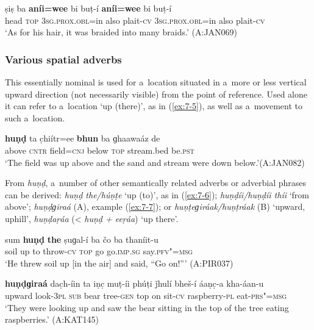 \begin{exe}
\ex
\label{ex:7-4}
\gll ṣiṣ ba \textbf{aníi=wee} bi buṭ-í \textbf{aníi=wee}  bi buṭ-í \\
head \textsc{top} \textsc{3sg.prox.obl=}in also plait-\textsc{cv} \textsc{3sg.prox.obl=}in also plait-\textsc{cv} \\
\glt `As for his hair, it was braided into many braids.' (A:JAN069)
\end{exe}

\subsubsection*{Various spatial adverbs}

 This essentially nominal  is used for a~location situated in a~more or less vertical upward direction (not necessarily visible) from the point of reference. Used alone it can refer to a~location `up (there)', as in (\ref{ex:7-5}), as well as a~movement to such a~location.

\begin{exe}
\ex
\label{ex:7-5}
\gll \textbf{huṇḍ} ta c̣hiítr=ee \textbf{bhun} ba ɡhaawaáz de  \\
above \textsc{cntr} field=\textsc{cnj} below \textsc{top} stream.bed be.\textsc{pst} \\
\glt `The field was up above and the sand and stream were down below.'\newline (A:JAN082)
\end{exe}
From \textit{huṇḍ}, a~number of other semantically related adverbs or adverbial phrases can be derived: \textit{huṇḍ the/húṇṭe} `up (to)', as in (\ref{ex:7-6}); \textit{huṇḍíi/huṇḍíi thíi} `from above'; \textit{huṇḍɡiraá} (A), example (\ref{ex:7-7}); or \textit{huṇṭeɡiráak/huṇṭráak} (B) `upward, uphill', \textit{huṇḍaṛáa} ({\textless} \textit{huṇḍ + eeṛáa}) `up there'.

\begin{exe}
\ex
\label{ex:7-6}
\gll sum \textbf{huṇḍ} \textbf{the} ṣuɡal-í ba čo ba  thaníit-u \\
soil up to throw-\textsc{cv} \textsc{top} go go.\textsc{imp.sg} say.\textsc{pfv"=msg} \\
\glt `He threw soil up [in the air] and said, ``Go on!''' (A:PIR037)

\ex
\label{ex:7-7}
\gll \textbf{huṇḍɡiraá} dac̣h-íin ta iṇc̣ muṭ-íi phúṭi ǰhulí bheš-í áaṇc̣-a kha-áan-u \\
upward  look-\textsc{3pl} \textsc{sub} bear tree-\textsc{gen} top on sit-\textsc{cv} raspberry-\textsc{pl} eat-\textsc{prs"=msg} \\
\glt `They were looking up and saw the bear sitting in the top of the tree eating raspberries.' (A:KAT145)
\end{exe}

